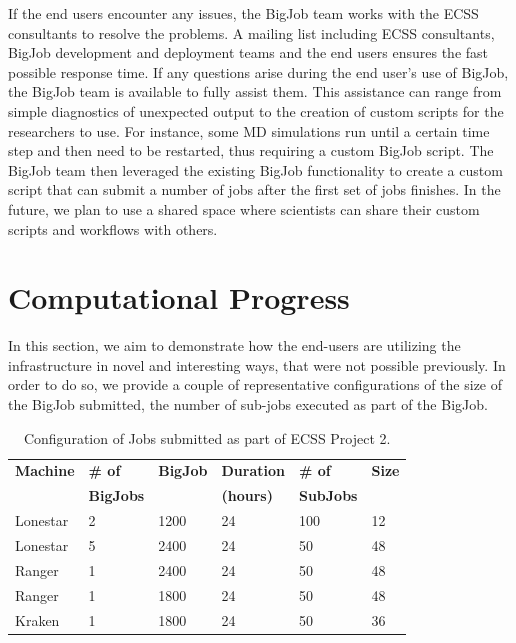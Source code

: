 \documentclass{sig-alternate}
\begin{document}
If the end users encounter any issues, the BigJob team works with the ECSS
consultants to resolve the problems. A mailing list including ECSS consultants,
BigJob development and deployment teams and the end users ensures the fast
possible response time. If any questions arise during the end user's use of
BigJob, the BigJob team is available to fully assist them. This assistance can
range from simple diagnostics of unexpected output to  the creation of
custom scripts for the researchers to use. For instance, some MD simulations
run until a certain time step and then need to be restarted, thus requiring a
custom BigJob script. The BigJob team then leveraged the existing BigJob
functionality to create a custom script that can submit a number of jobs after
the first set of jobs finishes. In the future, we plan to use a shared space
where scientists can share their custom scripts and workflows with others.

\section{Computational Progress}

In this section, we aim to demonstrate how the end-users are utilizing
the infrastructure in novel and interesting ways, that were not
possible previously. In order to do so, we provide a couple of
representative configurations of the size of the BigJob submitted, the
number of sub-jobs executed as part of the BigJob.


\begin{table}[h]
\begin{center}
\begin{tabular}{p{1.1cm}p{1.2cm}p{0.8cm}p{1.2cm}p{1.1cm}p{0.8cm}}
\toprule
\textbf{Machine}  & 
\textbf{\# of}    &
\textbf{BigJob}     & 
\textbf{Duration} & 
\textbf{\# of}    &
\textbf{Size}     \\
                  &
\textbf{BigJobs}  &
                  &
\textbf{(hours)}  &
\textbf{SubJobs}  &
                  \\ \midrule
Lonestar & 2 & 1200 & 24 & 100 & 12 \\ \midrule
Lonestar & 5 & 2400 & 24 &  50 & 48 \\ \midrule
Ranger   & 1 & 2400 & 24 &  50 & 48 \\ \midrule
Ranger   & 1 & 1800 & 24 &  50 & 48 \\ \midrule
Kraken   & 1 & 1800 & 24 &  50 & 36 \\ \bottomrule
\end{tabular}
\caption{Configuration of Jobs submitted as part of ECSS Project
  2. }
\label{table:results1}
\end{center}
\end{table}
\end{document}
